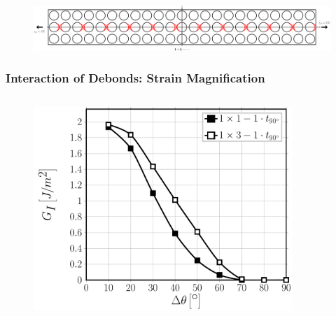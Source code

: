 \documentclass[first,firstsupp,lastsupp,last,hyperref,table]{ETHclass}
\begin{document}
\begin{frame}
\begin{columns}[c]
\begin{column}{0.5\textwidth}
\begin{figure}
\end{figure}
\end{column}
\end{columns}
\begin{figure}
\centering
\includegraphics[width=\textwidth]{twofibers-sameside-crackshielding1.pdf}
\end{figure}
\end{frame}

\begin{frame}
\frametitle{\vspace{0.2cm}\small Interaction of Debonds: Strain Magnification}
\vspace{-.75cm}
\centering
\begin{columns}[c]
\centering
\begin{column}{0.5\textwidth}
\centering
\begin{figure}
\centering
\includegraphics[width=\columnwidth]{nxk-1-vf60-GI-strainmagni1.pdf}
\end{figure}
\end{column}
\begin{column}{0.5\textwidth}
\centering
\begin{figure}
\centering

\end{figure}
\end{column}
\end{columns}
\end{frame}
\end{document}
